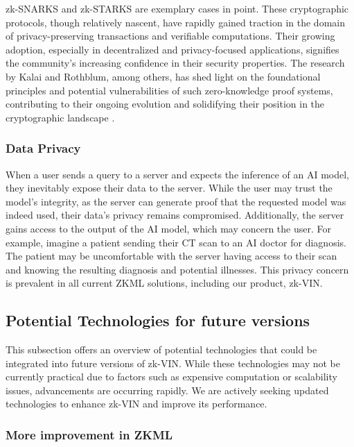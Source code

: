 \documentclass[conference]{IEEEtran}
\begin{document}
zk-SNARKS and zk-STARKS are exemplary cases in point. These cryptographic protocols, though relatively nascent, have rapidly gained traction in the domain of privacy-preserving transactions and veriﬁable computations. Their growing adoption, especially in decentralized and privacy-focused applications, signiﬁes the community’s increasing conﬁdence in their security properties. The research by Kalai and Rothblum, among others, has shed light on the foundational principles and potential vulnerabilities of such zero-knowledge proof systems, contributing to their ongoing evolution and solidifying their position in the cryptographic landscape .

\subsubsection{Data Privacy}
When a user sends a query to a server and expects the inference of an AI model, they inevitably expose their data to the server. While the user may trust the model's integrity, as the server can generate proof that the requested model was indeed used, their data's privacy remains compromised. Additionally, the server gains access to the output of the AI model, which may concern the user. For example, imagine a patient sending their CT scan to an AI doctor for diagnosis. The patient may be uncomfortable with the server having access to their scan and knowing the resulting diagnosis and potential illnesses. This privacy concern is prevalent in all current ZKML solutions, including our product, zk-VIN.


\subsection{Potential Technologies for future versions}

This subsection offers an overview of potential technologies that could be integrated into future versions of zk-VIN. While these technologies may not be currently practical due to factors such as expensive computation or scalability issues, advancements are occurring rapidly. We are actively seeking updated technologies to enhance zk-VIN and improve its performance.


\subsubsection{More improvement in ZKML}
\end{document}
